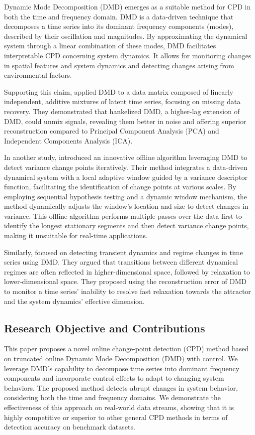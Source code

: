 Dynamic Mode Decomposition (DMD) emerges as a suitable method for CPD in both the time and frequency domain. DMD is a data-driven technique that decomposes a time series into its dominant frequency components (modes), described by their oscillation and magnitudes. By approximating the dynamical system through a linear combination of these modes, DMD facilitates interpretable CPD concerning system dynamics. It allows for monitoring changes in spatial features and system dynamics and detecting changes arising from environmental factors.

Supporting this claim, \citet{Prasadan2020} applied DMD to a data matrix composed of linearly independent, additive mixtures of latent time series, focusing on missing data recovery. They demonstrated that hankelized DMD, a higher-lag extension of DMD, could unmix signals, revealing them better in noise and offering superior reconstruction compared to Principal Component Analysis (PCA) and Independent Components Analysis (ICA).

In another study, \citet{Srivastava2017} introduced an innovative offline algorithm leveraging DMD to detect variance change points iteratively. Their method integrates a data-driven dynamical system with a local adaptive window guided by a variance descriptor function, facilitating the identification of change points at various scales. By employing sequential hypothesis testing and a dynamic window mechanism, the method dynamically adjusts the window's location and size to detect changes in variance. This offline algorithm performs multiple passes over the data first to identify the longest stationary segments and then detect variance change points, making it unsuitable for real-time applications.

Similarly, \citet{Gottwald2020} focused on detecting transient dynamics and regime changes in time series using DMD\@. They argued that transitions between different dynamical regimes are often reflected in higher-dimensional space, followed by relaxation to lower-dimensional space. They proposed using the reconstruction error of DMD to monitor a time series' inability to resolve fast relaxation towards the attractor and the system dynamics' effective dimension.

\subsection{Research Objective and Contributions}
This paper proposes a novel online change-point detection (CPD) method based on truncated online Dynamic Mode Decomposition (DMD) with control. We leverage DMD's capability to decompose time series into dominant frequency components and incorporate control effects to adapt to changing system behaviors. The proposed method detects abrupt changes in system behavior, considering both the time and frequency domains. We demonstrate the effectiveness of this approach on real-world data streams, showing that it is highly competitive or superior to other general CPD methods in terms of detection accuracy on benchmark datasets.

